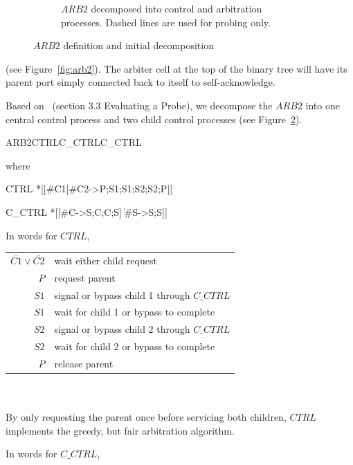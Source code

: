 \documentclass[aer.tex]{subfiles}
\begin{document}
\begin{figure}
\begin{subfigure}[t]{.4\textwidth}
    \caption{$ARB2$ decomposed into control and arbitration processes. 
    Dashed lines are used for probing only.}
    \label{fig:ctrl}
  \end{subfigure}
  \caption{$ARB2$ definition and initial decomposition}
\end{figure}

\noindent (see Figure~\ref{fig:arb2}). 
The arbiter cell at the top of the binary tree will have its parent port simply connected back to itself to self-acknowledge.

Based on~\cite{precise_exceptions} (section 3.3 Evaluating a Probe),
we decompose the $ARB2$ into one central control process and 
two child control processes (see Figure~\ref{fig:ctrl}).

\begin{csp}
ARB2\equiv\!CTRL\pll\!C_CTRL\pll\!C_CTRL
\end{csp}

\noindent where
\begin{csp}
CTRL\equiv
  *[[#{C1}|#{C2}->P;S1;S1;S2;S2;P]]

C_CTRL\equiv
  *[[#{C}->S;C;C;S]
    \|#{S}->S;S]]
\end{csp}

\noindent In words for $CTRL$,

\begin{tabular}[]{rl}
  $\overline{C1}\lor\overline{C2}$ & wait either child request \\
  $P$ & request parent \\
  $S1$ & signal or bypass child 1 through $C\_CTRL$ \\
  $S1$ & wait for child 1 or bypass to complete \\
  $S2$ & signal or bypass child 2 through $C\_CTRL$ \\
  $S2$ & wait for child 2 or bypass to complete \\
  $P$ & release parent \\
\end{tabular} \\ \\

By only requesting the parent once before servicing both children, $CTRL$ implements the greedy, but fair
arbitration algorithm.

\noindent In words for $C\_CTRL$,
\end{document}
